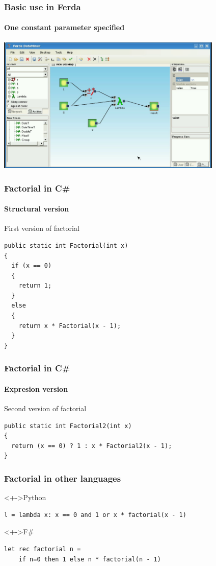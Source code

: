 \documentclass{beamer}
\begin{document}
\begin{frame}
	\frametitle{Basic use in Ferda}
	\framesubtitle{One constant parameter specified}
	\includegraphics[width=10.8cm]{lambdaBasic3.png}
\end{frame}

\begin{frame}[fragile]
	\frametitle{Factorial in C\#}
	\framesubtitle{Structural version}

	\begin{block}{First version of factorial}
\begin{verbatim}
public static int Factorial(int x)
{
  if (x == 0)
  {
    return 1;
  }
  else
  {
    return x * Factorial(x - 1);
  }
}
\end{verbatim}
	\end{block}
\end{frame}

\begin{frame}[fragile]
	\frametitle{Factorial in C\#}
	\framesubtitle{Expresion version}

	\begin{block}{Second version of factorial}
\begin{verbatim}
public static int Factorial2(int x)
{
  return (x == 0) ? 1 : x * Factorial2(x - 1);
}
\end{verbatim}
	\end{block}
\end{frame}

\begin{frame}[fragile]
        \frametitle{Factorial in other languages}

	\begin{block}<+->{Python}
\begin{verbatim}
l = lambda x: x == 0 and 1 or x * factorial(x - 1)
\end{verbatim}
	\end{block}

	\begin{block}<+->{F\#}
\begin{verbatim}
let rec factorial n =
    if n=0 then 1 else n * factorial(n - 1)
\end{verbatim}
	\end{block}
\end{frame}
\end{document}
